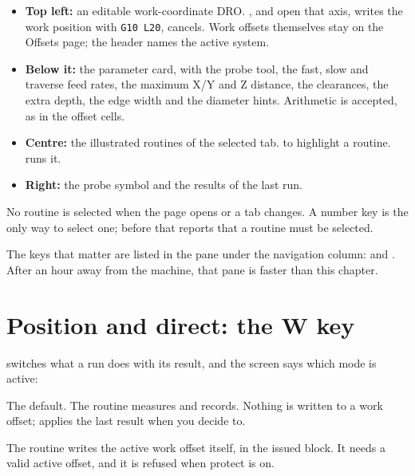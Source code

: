 \begin{itemize}
  \item \textbf{Top left:} an editable work-coordinate DRO. ,  and
         open that axis,  writes the work position with
        \texttt{G10 L20},  cancels. Work offsets themselves stay on the Offsets
        page; the header names the active system.
  \item \textbf{Below it:} the parameter card, with the probe tool, the fast, slow and
        traverse feed rates, the maximum X/Y and Z distance, the clearances, the extra depth,
        the edge width and the diameter hints. Arithmetic is accepted, as in the offset cells.
  \item \textbf{Centre:} the illustrated routines of the selected tab.  to
         highlight a routine.  runs it.
  \item \textbf{Right:} the probe symbol and the results of the last run.
\end{itemize}

No routine is selected when the page opens or a tab changes. A number key is the only way to
select one;  before that reports that a routine must be selected.

\begin{tipbox}
  The keys that matter are listed in the pane under the navigation column: 
  and . After an hour away from the machine, that pane is faster than this
  chapter.
\end{tipbox}

\section{Position and direct: the W key}

 switches what a run does with its result, and the screen says which mode is active:

\begin{description}[font=\normalfont\sffamily\bfseries, leftmargin=3.4cm, style=nextline]
  \item[\state{POSITION}] The default. The routine measures and records. Nothing is written to
        a work offset;  applies the last result when you decide to.
  \item[\state{DIRECT WCO}] The routine writes the active work offset itself, in the issued
        block. It needs a valid active offset, and it is refused when protect is on.
\end{description}

